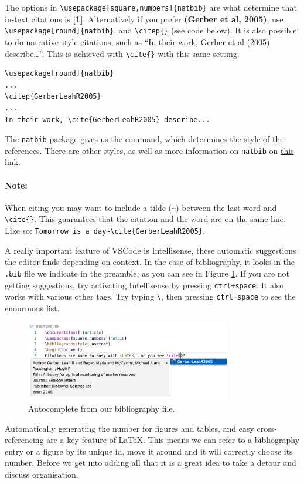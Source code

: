 The options in \verb|\usepackage[square,numbers]{natbib}| are what determine that in-text citations is \textbf{[1]}.
Alternatively if you prefer \textbf{(Gerber et al, 2005)}, use \verb|\usepackage[round]{natbib}|, and \verb|\citep{}| (see code below).
It is also possible to do narrative style citations, such as ``In their work, Gerber et al (2005) describe\dots''. This is achieved with \verb|\cite{}| with this same setting.

\begin{lstlisting}
\usepackage[round]{natbib}
...
\citep{GerberLeahR2005}
...
In their work, \cite{GerberLeahR2005} describe...
\end{lstlisting}

The \verb|natbib| package gives us the \verb|| command, which determines the style of the references.
There are other styles, as well as more information on \verb|natbib| on \href{https://ftp.eq.uc.pt/software/TeX/macros/latex/contrib/natbib/natnotes.pdf}{this} link. 

\paragraph{Note:}
When citing you may want to include a tilde (\verb|~|) between the last word and \verb|\cite{}|. This guarantees that the citation and the word are on the same line. Like so: \verb|Tomorrow is a day~\cite{GerberLeahR2005}|.

A really important feature of VSCode is Intellisense, these automatic suggestions the editor finds depending on context.
In the case of bibliography, it looks in the \verb|.bib| file we indicate in the preamble, as you can see in Figure \ref{fig:intellisense}.
If you are not getting suggestions, try activating Intellisense by pressing \verb|ctrl+space|.
It also works with various other tags. Try typing \texttt{\textbackslash}, then pressing \verb|ctrl+space| to see the enourmous list.
\begin{figure}[h]
  \centering
  \includegraphics[width=0.8\textwidth]{figures/intellisense.png}
  \caption{Autocomplete from our bibliography file.}
  \label{fig:intellisense}
\end{figure}

Automatically generating the number for figures and tables, and easy cross-referencing are a key feature of \LaTeX.
This means we can refer to a bibliography entry or a figure by its unique id, move it around and it will correctly choose its number.
Before we get into adding all that it is a great idea to take a detour and discuss organisation.